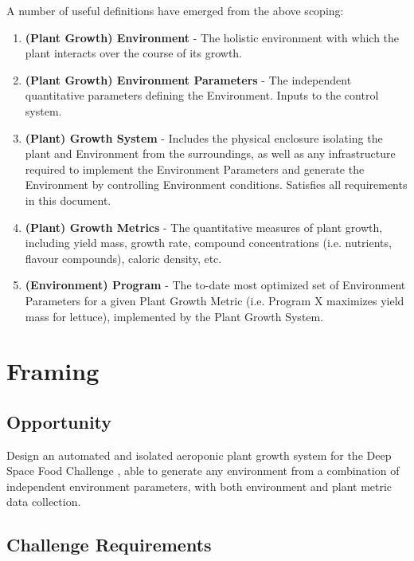 \documentclass{report}
\begin{document}
A number of useful definitions have emerged from the above scoping:
\begin{enumerate}
\item \textbf{(Plant Growth) Environment} - The holistic environment with which the plant interacts over the course of its growth.
\item \textbf{(Plant Growth) Environment Parameters} - The independent quantitative parameters defining the Environment. Inputs to the control system.
\item \textbf{(Plant) Growth System} - Includes the physical enclosure isolating the plant and Environment from the surroundings, as well as any infrastructure required to implement the Environment Parameters and generate the Environment by controlling Environment conditions. Satisfies all requirements in this document.
\item \textbf{(Plant) Growth Metrics} - The quantitative measures of plant growth, including yield mass, growth rate, compound concentrations (i.e. nutrients, flavour compounds), caloric density, etc.
\item \textbf{(Environment) Program} - The to-date most optimized set of Environment Parameters for a given Plant Growth Metric (i.e. Program X maximizes yield mass for lettuce), implemented by the Plant Growth System.
\end{enumerate}

\newpage
\section{Framing}
\label{sec:framing}

\subsection{Opportunity}
\label{sec:opportunity}

Design an automated and isolated aeroponic plant growth system for the Deep Space Food Challenge \cite{dsfc}, able to generate any environment from a combination of independent environment parameters, with both environment and plant metric data collection.

\subsection{Challenge Requirements}
\label{sec:requirements}
\end{document}

